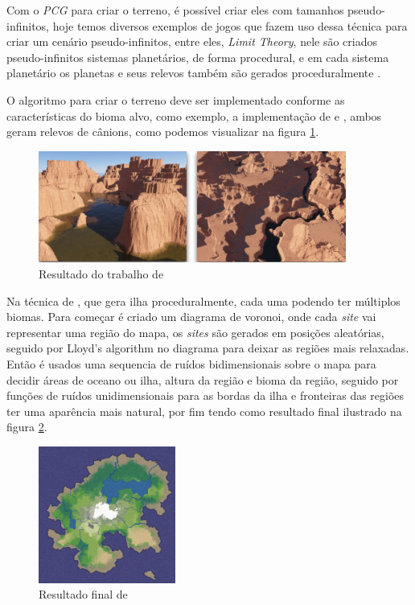 Com o \textit{PCG} para criar o terreno, é possível criar eles com tamanhos
pseudo-infinitos, hoje temos diversos exemplos de jogos que fazem uso dessa técnica
para criar um cenário pseudo-infinitos, entre eles, \textit{Limit Theory}, nele
são criados pseudo-infinitos sistemas planetários, de forma procedural, e em cada
sistema planetário os planetas e seus relevos também são gerados proceduralmente
\cite{abreu1990toward}.

O algoritmo para criar o terreno deve ser implementado conforme as
características do bioma alvo, como exemplo, a implementação de 
\cite{gabrielle2016canion} e \cite{carli2012canion}, ambos geram relevos de
cânions, como podemos visualizar na figura \ref{fig:carli2012result}.
\begin{figure}[H]
    \centering
    \includegraphics[width=0.9\textwidth]{figuras/carli2012result.png}
    \caption{Resultado do trabalho de \cite{carli2012canion}}
    \label{fig:carli2012result}
\end{figure}

Na técnica de \cite{patel2010polygonal}, que gera ilha proceduralmente, cada uma podendo ter
múltiplos biomas. Para começar é criado um diagrama de voronoi, onde cada \textit{site}
vai representar uma região do mapa, os \textit{sites} são gerados em posições
aleatórias, seguido por Lloyd's algorithm no diagrama para
deixar as regiões mais relaxadas.
Então é usados uma sequencia de ruídos bidimensionais sobre o mapa para decidir
áreas de oceano ou ilha, altura da região e bioma da região, seguido por funções
de ruídos unidimensionais para as bordas da ilha e fronteiras das regiões ter
uma aparência mais natural, por fim tendo como resultado final ilustrado na
figura \ref{fig:voronoi-map-goal-distorted}.
\begin{figure}[H]
    \centering
    \includegraphics[width=0.4\textwidth]{figuras/voronoi-map-goal-distorted.png}
    \caption{Resultado final de \cite{patel2010polygonal}}
    \label{fig:voronoi-map-goal-distorted}
\end{figure}

